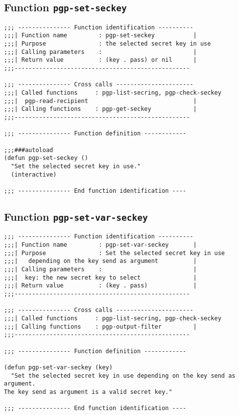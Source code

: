 \subsection{Function {\tt pgp-set-seckey}}
\leavevmode
\begin{verbatim}
;;; --------------- Function identification ----------
;;;| Function name         : pgp-set-seckey           |
;;;| Purpose               : the selected secret key in use
;;;| Calling parameters    :                          |
;;;| Return value          : (key . pass) or nil      |
;;;--------------------------------------------------

;;; --------------- Cross calls ----------------------
;;;| Called functions     : pgp-list-secring, pgp-check-seckey
;;;|  pgp-read-recipient                              |
;;;| Calling functions    : pgp-get-seckey            |
;;;--------------------------------------------------

;;; --------------- Function definition ------------

;;;###autoload
(defun pgp-set-seckey ()
  "Set the selected secret key in use."
  (interactive)

;;; --------------- End function identification ----
\end{verbatim}
\subsection{Function {\tt pgp-set-var-seckey}}
\leavevmode
\begin{verbatim}
;;; --------------- Function identification ----------
;;;| Function name         : pgp-set-var-seckey       |
;;;| Purpose               : Set the selected secret key in use
;;;|   depending on the key send as argument          |
;;;| Calling parameters    :                          |
;;;|  key: the new secret key to select               |
;;;| Return value          : (key . pass)             |
;;;--------------------------------------------------

;;; --------------- Cross calls ----------------------
;;;| Called functions     : pgp-list-secring, pgp-check-seckey
;;;| Calling functions    : pgp-output-filter         |
;;;--------------------------------------------------

;;; --------------- Function definition ------------

(defun pgp-set-var-seckey (key)
  "Set the selected secret key in use depending on the key send as argument.
The key send as argument is a valid secret key."

;;; --------------- End function identification ----
\end{verbatim}
